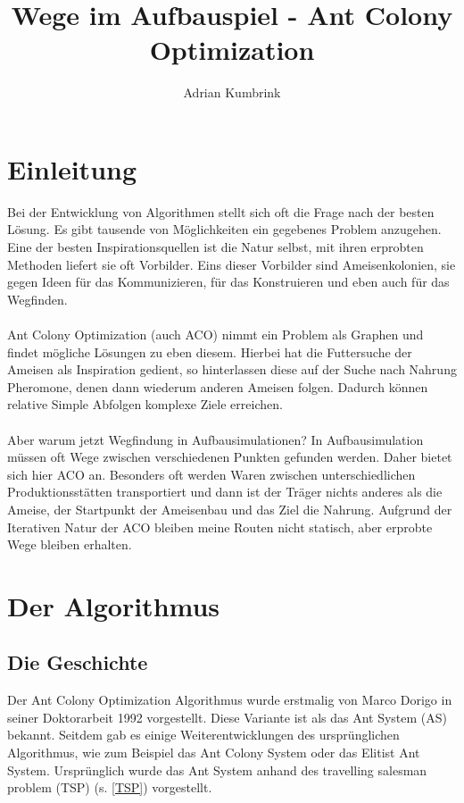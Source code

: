 \documentclass[12pt]{article}
\title{Wege im Aufbauspiel - Ant Colony Optimization}
\author{Adrian Kumbrink}
\begin{document}
\begin{titlepage}


\maketitle
\thispagestyle{empty}

\end{titlepage}



\thispagestyle{empty}
\tableofcontents
\pagebreak


\section{Einleitung} \label{Einleitung}
Bei der Entwicklung von Algorithmen stellt sich oft die Frage nach der besten Lösung. Es gibt tausende von Möglichkeiten ein gegebenes Problem anzugehen. Eine der besten Inspirationsquellen ist die Natur selbst, mit ihren erprobten Methoden liefert sie oft Vorbilder. Eins dieser Vorbilder sind Ameisenkolonien, sie gegen Ideen für das Kommunizieren, für das Konstruieren und eben auch für das Wegfinden.\\\\
Ant Colony Optimization (auch ACO) nimmt ein Problem als Graphen und findet mögliche Lösungen zu eben diesem. Hierbei hat die Futtersuche der Ameisen als Inspiration gedient, so hinterlassen diese auf der Suche nach Nahrung Pheromone, denen dann wiederum anderen Ameisen folgen. Dadurch können  relative Simple Abfolgen komplexe Ziele erreichen.\\\\
Aber warum jetzt Wegfindung in Aufbausimulationen? In Aufbausimulation müssen oft Wege zwischen verschiedenen Punkten gefunden werden. Daher bietet sich hier ACO an. Besonders oft werden Waren zwischen unterschiedlichen Produktionsstätten transportiert und dann ist der Träger nichts anderes als die Ameise, der Startpunkt der Ameisenbau und das Ziel die Nahrung. Aufgrund der Iterativen Natur der ACO bleiben meine Routen nicht statisch, aber erprobte Wege bleiben erhalten.
\section{Der Algorithmus}
\subsection{Die Geschichte}\label{Geschichte}
Der Ant Colony Optimization Algorithmus wurde erstmalig von Marco Dorigo in seiner Doktorarbeit 1992 vorgestellt. Diese Variante ist als das Ant System (AS) bekannt. Seitdem gab es einige Weiterentwicklungen des ursprünglichen Algorithmus, wie zum Beispiel das Ant Colony System oder das Elitist Ant System.
Ursprünglich wurde das Ant System anhand des travelling salesman problem (TSP) (s. \ref{TSP}) vorgestellt.
\end{document}
